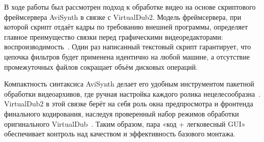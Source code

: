 В ходе работы был рассмотрен подход к обработке видео на основе скриптового
фреймсервера AviSynth в связке с VirtualDub2. Модель фреймсервера, при
которой скрипт отдаёт кадры по требованию внешней программы, определяет
главное преимущество связки перед графическими видеоредакторами:
воспроизводимость~\cite{avisynth}. Один раз написанный текстовый скрипт
гарантирует, что цепочка фильтров будет применена идентично на любой
машине, а отсутствие промежуточных файлов сокращает объём дисковых
операций.

Компактность синтаксиса AviSynth делает его удобным инструментом пакетной
обработки видеоархивов, где ручная настройка каждого ролика
нецелесообразна~\cite{avisynth}. VirtualDub2 в этой связке берёт на себя
роль окна предпросмотра и фронтенда финального кодирования, наследуя
проверенный набор режимов обработки оригинального
VirtualDub~\cite{virtualdub}. Таким образом, пара «код + легковесный GUI»
обеспечивает контроль над качеством и эффективность базового монтажа.
